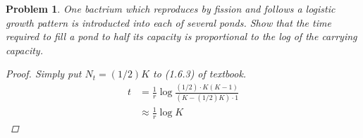 \documentclass[12pt]{report}
\newtheorem{problem}{Problem}[chapter]
\begin{document}
        \begin{problem}
            One bactrium which reproduces by fission and follows a logistic growth pattern is introducted into each of several ponds.
            Show that the time required to fill a pond to half its capacity is proportional to the log of the carrying capacity.
            \begin{proof}
                Simply put $N_t=(1/2)K$ to (1.6.3) of textbook.
               \begin{equation*}
                   \begin{split}
                       t &= \frac{1}{r} \log \frac{(1/2)\cdot K(K-1)}{(K-(1/2)K)\cdot 1} \\
                         &\approx \frac{1}{r} \log{K}
                   \end{split}
               \end{equation*}

            \end{proof}
        \end{problem}
\end{document}
